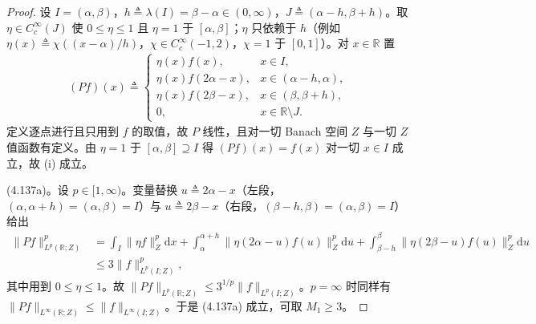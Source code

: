 \documentclass[../../main.tex]{subfiles}%
\begin{document}
\begin{proof}
设 $I=(\alpha,\beta)$，$h\triangleq\lambda(I)=\beta-\alpha\in(0,\infty)$，$J\triangleq(\alpha-h,\beta+h)$。取 $\eta\in C_c^\infty(J)$ 使 $0\leqslant\eta\leqslant1$ 且 $\eta=1$ 于 $[\alpha,\beta]$；$\eta$ 只依赖于 $h$（例如 $\eta(x)\triangleq\chi((x-\alpha)/h)$，$\chi\in C_c^\infty(-1,2)$，$\chi=1$ 于 $[0,1]$）。对 $x\in\mathbb{R}$ 置
\begin{align*}
(Pf)(x)\triangleq
\begin{cases}
\eta(x)f(x), & x\in I,\\
\eta(x)f(2\alpha-x), & x\in(\alpha-h,\alpha),\\
\eta(x)f(2\beta-x), & x\in(\beta,\beta+h),\\
0, & x\in\mathbb{R}\setminus J .
\end{cases}
\end{align*}
定义逐点进行且只用到 $f$ 的取值，故 $P$ 线性，且对一切 Banach 空间 $Z$ 与一切 $Z$ 值函数有定义。由 $\eta=1$ 于 $[\alpha,\beta]\supseteq I$ 得 $(Pf)(x)=f(x)$ 对一切 $x\in I$ 成立，故 (i) 成立。

(4.137a)。设 $p\in[1,\infty)$。变量替换 $u\triangleq2\alpha-x$（左段，$(\alpha,\alpha+h)=(\alpha,\beta)=I$）与 $u\triangleq2\beta-x$（右段，$(\beta-h,\beta)=(\alpha,\beta)=I$）给出
\begin{align*}
\|Pf\|^p_{L^p(\mathbb{R};Z)}&=\int_I\|\eta f\|^p_Z\mathrm{d}x+\int_\alpha^{\alpha+h}\|\eta(2\alpha-u)f(u)\|^p_Z\mathrm{d}u+\int_{\beta-h}^{\beta}\|\eta(2\beta-u)f(u)\|^p_Z\mathrm{d}u\\
&\leqslant3\|f\|^p_{L^p(I;Z)},
\end{align*}
其中用到 $0\leqslant\eta\leqslant1$。故 $\|Pf\|_{L^p(\mathbb{R};Z)}\leqslant3^{1/p}\|f\|_{L^p(I;Z)}$。$p=\infty$ 时同样有 $\|Pf\|_{L^\infty(\mathbb{R};Z)}\leqslant\|f\|_{L^\infty(I;Z)}$。于是 (4.137a) 成立，可取 $M_1\geqslant3$。


\end{proof}
\end{document}
